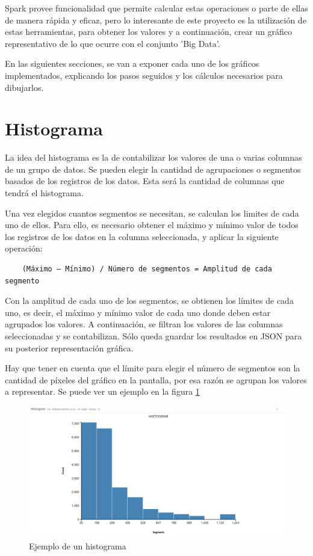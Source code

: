 Spark provee funcionalidad que permite calcular estas operaciones o parte de ellas de manera rápida y eficaz, pero lo interesante de este proyecto es la utilización de estas herramientas, para obtener los valores y a continuación, crear un gráfico representativo de lo que ocurre con el conjunto 'Big Data'.

En las siguientes secciones, se van a exponer cada uno de los gráficos implementados, explicando los pasos seguidos y los cálculos necesarios para dibujarlos.

\section{Histograma}
La idea del histograma es la de contabilizar los valores de una o varias columnas de un grupo de datos. Se pueden elegir la cantidad de agrupaciones o segmentos basados de los registros de los datos. Esta será la cantidad de columnas que tendrá el histograma. 

Una vez elegidos cuantos segmentos se necesitan, se calculan los limites de cada uno de ellos. Para ello, es necesario obtener el máximo y mínimo valor de todos los registros de los datos en la columna seleccionada, y aplicar la siguiente operación:

\begin{verbatim}
	(Máximo – Mínimo) / Número de segmentos = Amplitud de cada segmento
\end{verbatim}

Con la amplitud de cada uno de los segmentos, se obtienen los límites de cada uno, es decir, el máximo y mínimo valor de cada uno donde deben estar agrupados los valores. A continuación, se filtran los valores de las columnas seleccionadas y se contabilizan. Sólo queda guardar los resultados en JSON para su posterior representación gráfica.

Hay que tener en cuenta que el límite para elegir el número de segmentos son la cantidad de píxeles del gráfico en la pantalla, por esa razón se agrupan los valores a representar. Se puede ver un ejemplo en la figura \ref{fig:ejemplohistograma}
\begin{figure}
	\centering
	\includegraphics[width=1\linewidth]{imagenes/ejemplo_histograma}
	\caption{Ejemplo de un histograma}
	\label{fig:ejemplohistograma}
\end{figure}

